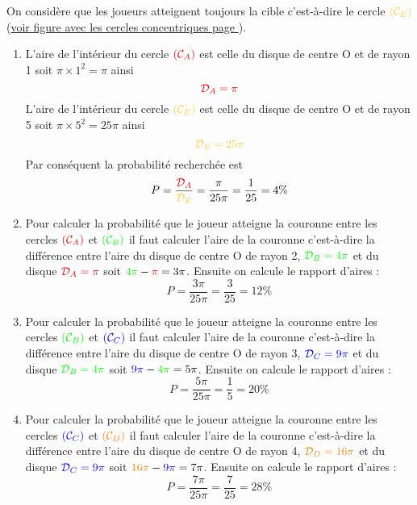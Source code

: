 
On considère que les joueurs atteignent toujours la cible c'est-à-dire le cercle $\textcolor{yellow}{(\mathcal{C}_{E})}$ (\hyperref[fig:proba-target]{voir figure avec les cercles concentriques page \pageref{fig:proba-target}}).

\begin{enumerate}[label=G\arabic*)]
\item L'aire de l'intérieur du cercle $\textcolor{red}{(\mathcal{C}_{A})}$ est celle du disque de centre O et de rayon 1 soit $\pi\times 1^2 = \pi$ ainsi \[\textcolor{red}{\mathcal{D}_{A} = \pi}\] 
L'aire de l'intérieur du cercle $\textcolor{yellow}{(\mathcal{C}_{E})}$ est celle du disque de centre O et de rayon 5 soit $\pi\times 5^2 = 25\pi$ ainsi \[ \textcolor{yellow}{\mathcal{D}_{E} = 25\pi}\]
Par conséquent la probabilité recherchée est  \[P = \dfrac{ \textcolor{red}{ \mathcal{D}_{A} } }{ \textcolor{yellow}{ \mathcal{D}_{E} } } = \dfrac{\pi}{25\pi} = \dfrac{1}{25} = 4\% \]
\item Pour calculer la probabilité que le joueur atteigne la couronne entre les cercles $\textcolor{red}{(\mathcal{C}_{A})}$ et $\textcolor{lime}{(\mathcal{C}_{B})}$ il faut calculer l'aire de la couronne c'est-à-dire la différence entre l'aire du disque de centre O de rayon 2, $\textcolor{lime}{\mathcal{D}_{B} = 4\pi}$ et du disque $\textcolor{red}{\mathcal{D}_{A} = \pi}$ soit $\textcolor{lime}{4\pi} - \textcolor{red}{\pi} = 3\pi$. Ensuite on calcule le rapport d'aires : \[P = \dfrac{3\pi}{25\pi} = \dfrac{3}{25} = 12\%\]
\item Pour calculer la probabilité que le joueur atteigne la couronne entre les cercles $\textcolor{lime}{(\mathcal{C}_{B})}$ et $\textcolor{navy}{(\mathcal{C}_{C})}$ il faut calculer l'aire de la couronne c'est-à-dire la différence entre l'aire du disque de centre O de rayon 3, $\textcolor{navy}{\mathcal{D}_{C} = 9\pi}$ et du disque $\textcolor{lime}{\mathcal{D}_{B} = 4\pi}$ soit $\textcolor{navy}{9\pi} - \textcolor{lime}{4\pi} = 5\pi$. Ensuite on calcule le rapport d'aires : \[P = \dfrac{5\pi}{25\pi} = \dfrac{1}{5} = 20\%\]
\item Pour calculer la probabilité que le joueur atteigne la couronne entre les cercles $\textcolor{navy}{(\mathcal{C}_{C})}$ et $\textcolor{orange}{(\mathcal{C}_{D})}$ il faut calculer l'aire de la couronne c'est-à-dire la différence entre l'aire du disque de centre O de rayon 4, $\textcolor{orange}{\mathcal{D}_{D} = 16\pi}$ et du disque $\textcolor{navy}{\mathcal{D}_{C} = 9\pi}$ soit $\textcolor{orange}{16\pi} - \textcolor{navy}{9\pi} = 7\pi$. Ensuite on calcule le rapport d'aires : \[P = \dfrac{7\pi}{25\pi} = \dfrac{7}{25} = 28\%\] 

\end{enumerate}
